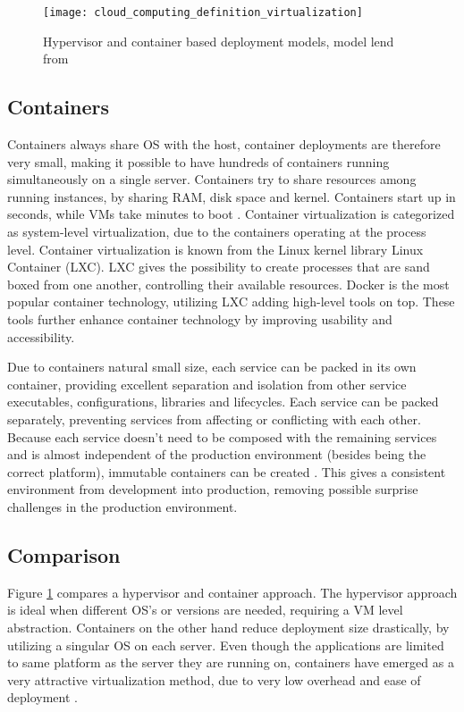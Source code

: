 \begin{figure}[!htb]
	\centering 
		 \texttt{[image: cloud\_computing\_definition\_virtualization]}  
	  \caption{Hypervisor and container based deployment models, model lend from \cite{bernstein2014containers}}
  \label{fig:cloud_computing_definition_virtualization}
\end{figure}

\subsection{Containers}
Containers always share OS with the host, container deployments are therefore very small, making it possible to have hundreds of containers running simultaneously on a single server. Containers try to share resources among running instances, by sharing RAM, disk space and kernel. Containers start up in seconds, while VMs take minutes to boot \cite{dockerFAQ}. Container virtualization is categorized as system-level virtualization, due to the containers operating at the process level. Container virtualization is known from the Linux kernel library Linux Container (LXC). LXC gives the possibility to create processes that are sand boxed from one another, controlling their available resources. Docker is the most popular container technology, utilizing LXC adding high-level tools on top. These tools further enhance container technology by improving usability and accessibility.

Due to containers natural small size, each service can be packed in its own container, providing excellent separation and isolation from other service executables, configurations, libraries and lifecycles. Each service can be packed separately, preventing services from affecting or conflicting with each other. Because each service doesn't need to be composed with the remaining services and is almost independent of the production environment (besides being the correct platform), immutable containers can be created \cite{kubernetes_what_is}. This gives a consistent environment from development into production, removing possible surprise challenges in the production environment.

\subsection{Comparison}
Figure \ref{fig:cloud_computing_definition_virtualization} compares a hypervisor and container approach. The hypervisor approach is ideal when different OS's or versions are needed, requiring a VM level abstraction\cite{bernstein2014containers}. Containers on the other hand reduce deployment size drastically, by utilizing a singular OS on each server. Even though the applications are limited to same platform as the server they are running on, containers have emerged as a very attractive virtualization method, due to very low overhead and ease of deployment \cite{fink2014docker}.

